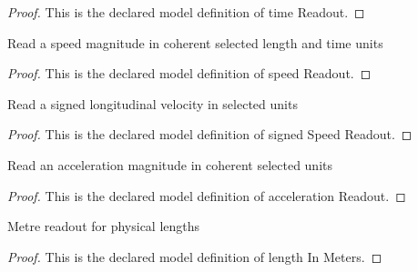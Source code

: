 \begin{proof}
  This is the declared model definition of time Readout.
\end{proof}
\begin{definition}
  \label{def:physics:phyx-mini-0730:phyxminiproblems-problemphyxmini0730-speedreadout}
  Read a speed magnitude in coherent selected length and time units
\end{definition}
\begin{proof}
  This is the declared model definition of speed Readout.
\end{proof}
\begin{definition}
  \label{def:physics:phyx-mini-0730:phyxminiproblems-problemphyxmini0730-signedspeedreadout}
  Read a signed longitudinal velocity in selected units
\end{definition}
\begin{proof}
  This is the declared model definition of signed Speed Readout.
\end{proof}
\begin{definition}
  \label{def:physics:phyx-mini-0730:phyxminiproblems-problemphyxmini0730-accelerationreadout}
  Read an acceleration magnitude in coherent selected units
\end{definition}
\begin{proof}
  This is the declared model definition of acceleration Readout.
\end{proof}
\begin{definition}
  \label{def:physics:phyx-mini-0730:phyxminiproblems-problemphyxmini0730-lengthinmeters}
  Metre readout for physical lengths
\end{definition}
\begin{proof}
  This is the declared model definition of length In Meters.
\end{proof}
